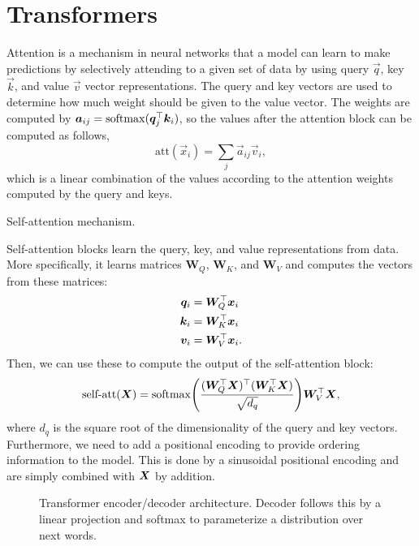 \section{Transformers} \label{sec:transformers}

Attention is a mechanism in neural networks that a model can learn to make
predictions by selectively attending to a given set of data by using query
$\vec{q}$, key $\vec{k}$, and value $\vec{v}$ vector representations. The query
and key vectors are used to determine how much weight should be given to the
value vector. The weights are computed by
$\bm{a}_{ij}=\mathrm{softmax}(\bm{q}_j^\top\bm{k}_i)$, so the values after the
attention block can be computed as follows, \[
  \text{att}(\vec{x}_i) = \sum_{j} \vec{a}_{ij} \vec{v}_i
,\]
which is a linear combination of the values according to the attention weights
computed by the query and keys.

\begin{marginfigure}
    \centering
    \caption{Self-attention mechanism.}
    \label{fig:attention}
\end{marginfigure}

Self-attention blocks learn the query, key, and value representations from
data. More specifically, it learns matrices $\bm{W}_Q$, $\bm{W}_K$, and
$\bm{W}_V$ and computes the vectors from these matrices:
\begin{align*}
  \bm{q}_i &= \bm{W}_Q^\top \bm{x}_i \\
  \bm{k}_i &= \bm{W}_K^\top \bm{x}_i \\
  \bm{v}_i &= \bm{W}_V^\top \bm{x}_i
.\end{align*}
Then, we can use these to compute the output of the self-attention block: \[
  \text{self-att}(\mat{X}) = \softmax \lft( \frac{\transpose{(\transpose{\mat{W}_Q} \mat{X})}(\transpose{\mat{W}_K}\mat{X})}{\sqrt{d_q}} \rgt) \transpose{\mat{W}_V}\mat{X}
,\]
where $d_q$ is the square root of the dimensionality of the query and key
vectors. Furthermore, we need to add a positional encoding to provide ordering
information to the model. This is done by a sinusoidal positional encoding and are simply
combined with $\bm{X}$ by addition.

\begin{figure}[ht]
    \centering
    \caption{Transformer encoder/decoder architecture. Decoder follows this by
    a linear projection and softmax to parameterize a distribution over next
    words.}
    \label{fig:transformer}
\end{figure}

